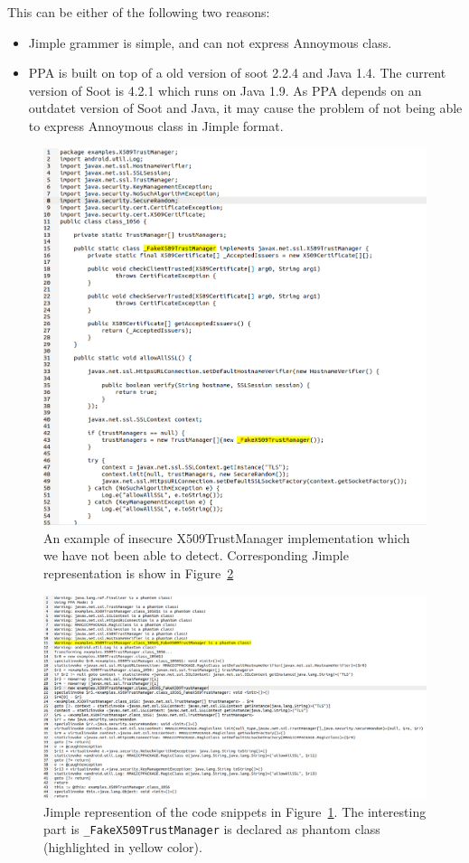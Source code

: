 This can be either of the  following two reasons:
\begin{itemize}  
\item Jimple grammer is simple, and can not express Annoymous class.
\item PPA is built on top of a old version of soot 2.2.4 and Java 1.4. The current version of Soot is 4.2.1 which runs on Java 1.9. 
As PPA depends on an outdatet version of Soot and Java, it may cause the problem of not being able to express Annoymous class in Jimple format.
\end{itemize}   
\begin{figure}[t]
\includegraphics[width=\linewidth]{Figures/Java_TrustManager.png}
\caption{An example of insecure X509TrustManager implementation which we have not been able to detect. 
Corresponding Jimple representation is show in Figure~\ref{fig:trustmanager-jimple} }
\label{fig:trustmanager}
\end{figure}
\begin{figure}[t]
\includegraphics[width=\linewidth]{Figures/Jimple_TrustManager.png}
\caption{Jimple represention of the code snippets in Figure~\ref{fig:trustmanager}. The interesting part is \texttt{\_FakeX509TrustManager} is declared as phantom class (highlighted in yellow color).}
\label{fig:trustmanager-jimple}
\end{figure}

